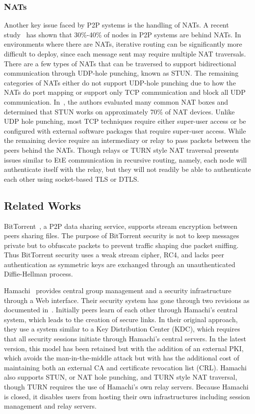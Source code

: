 \documentclass[conference]{IEEEtran}
\begin{document}
\subsubsection{NATs}
Another key issue faced by P2P systems is the handling of NATs.
A recent study~\cite{p2p_nats} has shown that 30\%-40\% of nodes in P2P systems
are behind NATs.  In environments where there are NATs, iterative routing can be
significantly more difficult to deploy, since each message sent may require
multiple NAT traversals.  There are a few types of NATs that can be traversed
to support bidirectional communication through UDP-hole punching, known as STUN.
The remaining categories of NATs either do not support UDP-hole punching due to
how the NATs do port mapping or support only TCP communication and block all
UDP communication.  In~\cite{tcp_nat}, the authors evaluated many common NAT
boxes and determined that STUN works on approximately 70\% of NAT devices.
Unlike UDP hole punching, most TCP techniques require either super-user access
or be configured with external software packages that require super-user access.
While the remaining device require an intermediary or relay to pass packets
between the peers behind the NATs.  Though relays or TURN style NAT traversal
presents issues similar to EtE communication in recursive routing, namely, each
node will authenticate itself with the relay, but they will not readily be
able to authenticate each other using socket-based TLS or DTLS.

\subsection{Related Works}
BitTorrent~\cite{bittorrent_security}, a P2P data sharing service,  supports
stream encryption between peers sharing files.  The purpose of BitTorrent
security is not to keep messages private but to obfuscate packets to
prevent traffic shaping due packet sniffing. Thus BitTorrent security uses a
weak stream cipher, RC4, and lacks peer authentication as symmetric keys are
exchanged through an unauthenticated Diffie-Hellman process.

Hamachi~\cite{hamachi} provides central group management and a security
infrastructure through a Web interface.  Their security system has gone through
two revisions as documented in~\cite{hamachi_security}.  Initially peers learn
of each other through Hamachi's central system, which leads to the creation of
secure links.  In their original approach, they use a system similar to a Key
Distribution Center (KDC), which requires that all security sessions initiate
through Hamachi's central servers.  In the latest version, this model has been
retained but with the addition of an external PKI, which avoids the
man-in-the-middle attack but with has the additional cost of maintaining both
an external CA and certificate revocation list (CRL).  Hamachi also supports
STUN, or NAT hole punching, and TURN style NAT traversal, though TURN requires the use of
Hamachi's own relay servers.  Because Hamachi is closed, it disables users from
hosting their own infrastructures including session management and relay
servers.
\end{document}
